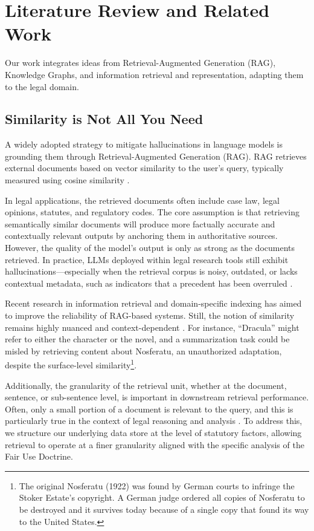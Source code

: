 \section{Literature Review and Related Work}
Our work integrates ideas from Retrieval-Augmented Generation (RAG), Knowledge Graphs, and information retrieval and representation, adapting them to the legal domain.

\subsection{Similarity is Not All You Need}
A widely adopted strategy to mitigate hallucinations in language models is grounding them through Retrieval-Augmented Generation (RAG). RAG retrieves external documents based on vector similarity to the user’s query, typically measured using cosine similarity \cite{09_OriginalRAGPaper}.

In legal applications, the retrieved documents often include case law, legal opinions, statutes, and regulatory codes. The core assumption is that retrieving semantically similar documents will produce more factually accurate and contextually relevant outputs by anchoring them in authoritative sources. However, the quality of the model’s output is only as strong as the documents retrieved. In practice, LLMs deployed within legal research tools still exhibit hallucinations—especially when the retrieval corpus is noisy, outdated, or lacks contextual metadata, such as indicators that a precedent has been overruled \cite{04_LegalHallucination}.

Recent research in information retrieval and domain-specific indexing has aimed to improve the reliability of RAG-based systems. Still, the notion of similarity remains highly nuanced and context-dependent \cite{03b_SemanticRepresentationContextual}. For instance, “Dracula” might refer to either the character or the novel, and a summarization task could be misled by retrieving content about Nosferatu, an unauthorized adaptation, despite the surface-level similarity\footnote{The original Nosferatu (1922) was found by German courts to infringe the Stoker Estate’s copyright. A German judge ordered all copies of Nosferatu to be destroyed and it survives today because of a single copy that found its way to the United States.}.

Additionally, the granularity of the retrieval unit, whether at the document, sentence, or sub-sentence level, is important in downstream retrieval performance. Often, only a small portion of a document is relevant to the query, and this is particularly true in the context of legal reasoning and analysis \cite{02_DenseRetrieval, 32_LegalCitationNetwork}. To address this, we structure our underlying data store at the level of statutory factors, allowing retrieval to operate at a finer granularity aligned with the specific analysis of the Fair Use Doctrine.

